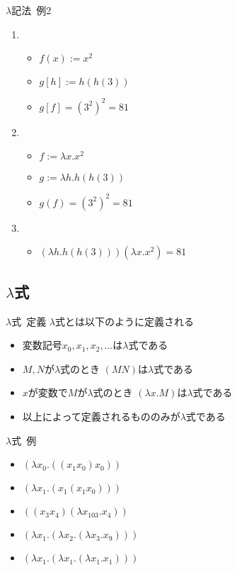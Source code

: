 \documentclass[pdflatex,17pt]{beamer}
\begin{document}
\begin{frame}{$\lambda$記法~例2}
    \begin{enumerate}
        \item \begin{itemize}
            \item $f(x) := x^2$
            \item $g[h] := h(h(3))$
            \item $g[f] = (3^2)^2 = 81$
        \end{itemize}
        \item \begin{itemize}
            \item $f := \lambda x. x^2$
            \item $g := \lambda h. h(h(3))$
            \item $g(f) = (3^2)^2 = 81$
        \end{itemize}
        \item \begin{itemize}
            \item $(\lambda h. h(h(3)))(\lambda x. x^2) = 81$
        \end{itemize}
    \end{enumerate}
\end{frame}

\subsection{$\lambda$式}
\subsectionpage
\begin{frame}{$\lambda$式~定義}
    $\lambda$式とは以下のように定義される
    \begin{itemize}
        \item 変数記号$x_0, x_1, x_2, \dots$は$\lambda$式である
        \item $M,N$が$\lambda$式のとき $(MN)$は$\lambda$式である
        \item $x$が変数で$M$が$\lambda$式のとき $(\lambda x. M)$は$\lambda$式である
        \item 以上によって定義されるもののみが$\lambda$式である
    \end{itemize}
\end{frame}

\begin{frame}{$\lambda$式~例}
    \begin{itemize}
        \item $(\lambda x_0. ((x_1 x_0) x_0))$
        \item $(\lambda x_1. (x_1 (x_1 x_0)))$
        \item $((x_3 x_4)(\lambda x_{103}. x_4))$
        \item $(\lambda x_1. (\lambda x_2. (\lambda x_3. x_9)))$
        \item $(\lambda x_1. (\lambda x_1. (\lambda x_1. x_1)))$
    \end{itemize}
\end{frame}
\end{document}
